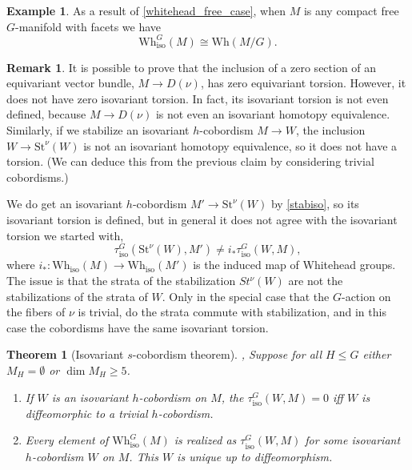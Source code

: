 \documentclass[11pt]{amsart}
\newtheorem{thm}{Theorem}[section]
\theoremstyle{definition}
\newtheorem{exmp}{Example}[section]
\newtheorem{rem}{Remark}[section]
\numberwithin{equation}{section}
\numberwithin{figure}{section}
\newcommand{\iso}{\mathrm{iso}}
\newcommand{\St}{\mathrm{St}}
\newcommand{\Wh}{\mathrm{Wh}}
\begin{document}
\begin{exmp}
As a result of \autoref{whitehead_free_case}, when $M$ is any compact free $G$-manifold with facets we have
\[ \Wh^G_{\iso}(M) \cong \Wh(M/G). \]
\end{exmp}

\begin{rem}
	It is possible to prove that the inclusion of a zero section of an equivariant vector bundle, $M \to D(\nu)$, has zero equivariant torsion. However, it does not have zero isovariant torsion. In fact, its isovariant torsion is not even defined, because $M \to D(\nu)$ is not even an isovariant homotopy equivalence. Similarly, if we stabilize an isovariant $h$-cobordism $M \to W$, the inclusion $W \to \St^\nu(W)$ is not an isovariant homotopy equivalence, so it does not have a torsion. (We can deduce this from the previous claim by considering trivial cobordisms.)
	
	We do get an isovariant $h$-cobordism $M' \to \St^\nu(W)$ by \autoref{stabiso}, so its isovariant torsion is defined, but in general it does not agree with the isovariant torsion we started with,
	\[ \tau^G_\iso(\St^\nu(W),M') \neq i_*\tau^G_\iso(W,M), \]
	where $i_*\colon \Wh_\iso(M) \to \Wh_{\iso}(M')$ is the induced map of Whitehead groups. The issue is that the strata of the stabilization $St^\nu(W)$ are not the stabilizations of the strata of $W$. Only in the special case that the $G$-action on the fibers of $\nu$ is trivial, do the strata commute with stabilization, and in this case the cobordisms have the same isovariant torsion.
\end{rem}


\begin{thm}[Isovariant $s$-cobordism theorem]\label{luck_442}\cite{equivsurgery,rothenberg},\cite[Thm 4.42]{luck}
	Suppose for all $H \leq G$ either $M_H = \emptyset$ or $\dim M_H \geq 5$.
	\begin{enumerate}
		\item[(a)] If $W$ is an isovariant $h$-cobordism on $M$, the $\tau^G_{\iso}(W,M) = 0$ iff $W$ is diffeomorphic to a trivial $h$-cobordism.
		\item[(b)] Every element of $\Wh^G_{\iso}(M)$ is realized as $\tau^G_{\iso}(W,M)$ for some isovariant $h$-cobordism $W$ on $M$. This $W$ is unique up to diffeomorphism.
	\end{enumerate}
\end{thm}
\end{document}
